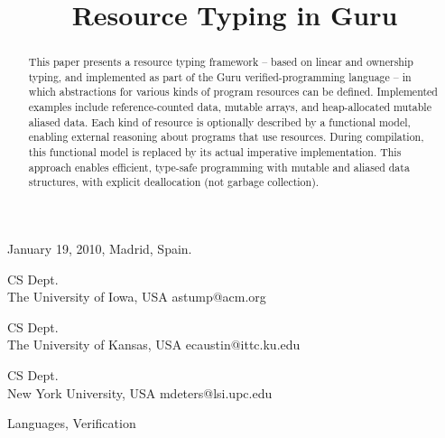 \documentclass[9pt,natbib]{sigplanconf}
\begin{document}
 {January 19, 2010, Madrid, Spain.}
\copyrightdata{\ } 

\titlebanner{\ }        %
\preprintfooter{\ }   %



\title{Resource Typing in Guru}

{CS Dept.\\ The University of Iowa, USA}
{astump@acm.org}

{CS Dept.\\ The University of Kansas, USA}
{ecaustin@ittc.ku.edu}

{CS Dept.\\ New York University, USA}
{mdeters@lsi.upc.edu}


\maketitle


\begin{abstract}
This paper presents a resource typing framework -- based on linear and
ownership typing, and implemented as part of the Guru
verified-programming language -- in which abstractions for various
kinds of program resources can be defined.  Implemented examples
include reference-counted data, mutable arrays, and heap-allocated
mutable aliased data.  Each kind of resource is optionally described
by a functional model, enabling external reasoning about programs that
use resources.  During compilation, this functional model is replaced
by its actual imperative implementation.  This approach enables
efficient, type-safe programming with mutable and aliased data
structures, with explicit deallocation (not garbage collection).
\end{abstract}


\terms
Languages, Verification
\end{document}
